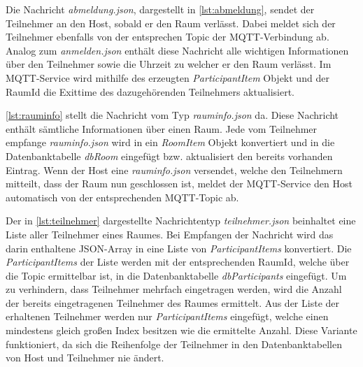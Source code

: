 Die Nachricht \textit{abmeldung.json}, dargestellt in \cref{lst:abmeldung},   sendet der Teilnehmer an den Host, sobald er den Raum verlässt. Dabei meldet sich der Teilnehmer ebenfalls von der entsprechen Topic der MQTT-Verbindung ab. Analog zum \textit{anmelden.json} enthält diese Nachricht alle wichtigen Informationen über den Teilnehmer sowie die Uhrzeit zu welcher er den Raum verlässt. Im MQTT-Service wird mithilfe des erzeugten \textit{ParticipantItem} Objekt und der RaumId die Exittime des dazugehörenden Teilnehmers aktualisiert.  

\cref{lst:rauminfo} stellt die Nachricht vom Typ \textit{rauminfo.json} da. Diese Nachricht enthält sämtliche Informationen über einen Raum. Jede vom Teilnehmer empfange \textit{rauminfo.json} wird in ein \textit{RoomItem} Objekt konvertiert und in die Datenbanktabelle \textit{dbRoom} eingefügt bzw. aktualisiert den bereits vorhanden Eintrag. Wenn der Host eine \textit{rauminfo.json} versendet, welche den Teilnehmern mitteilt, dass der Raum nun geschlossen ist, meldet der MQTT-Service den Host automatisch von der entsprechenden MQTT-Topic ab.

Der in \cref{lst:teilnehmer} dargestellte Nachrichtentyp \textit{teilnehmer.json} beinhaltet eine Liste aller Teilnehmer eines Raumes. Bei Empfangen der Nachricht wird das darin enthaltene JSON-Array in eine Liste von \textit{ParticipantItems} konvertiert. Die \textit{ParticipantItems} der Liste werden mit der entsprechenden RaumId, welche über die Topic ermittelbar ist, in die Datenbanktabelle \textit{dbParticipants} eingefügt. Um zu verhindern, dass Teilnehmer mehrfach eingetragen werden, wird die Anzahl der bereits eingetragenen Teilnehmer des Raumes ermittelt. Aus der Liste der erhaltenen Teilnehmer werden nur \textit{ParticipantItems} eingefügt, welche einen mindestens gleich großen Index besitzen wie die ermittelte Anzahl. Diese Variante funktioniert, da sich die Reihenfolge der Teilnehmer in den Datenbanktabellen von Host und Teilnehmer nie ändert.

